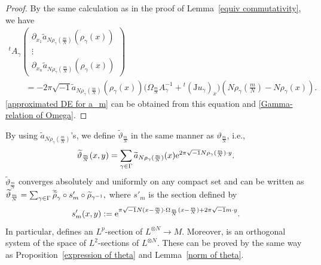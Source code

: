 \documentclass[pdftex]{sigma}
\numberwithin{equation}{section}
\newcommand{\Z}{\mathbb{Z}}
\renewcommand{\tilde}{\widetilde}
\newcommand{\vardbtilde}[1]{\tilde{\raisebox{0pt}[0.85\height]{$\tilde{#1}$}}}
\def\J{\mathrm{J}}
\begin{document}
\begin{proof}
By the same calculation as in the proof of Lemma~\ref{equiv commutativity}, we have
\begin{gather*}
{}^tA_{\gamma}
\begin{pmatrix}
\partial_{x_1}{\tilde a}_{N\rho_\gamma (\frac{m}{N})}( \rho_\gamma(x))\\
\vdots \\
\partial_{x_n}{\tilde a}_{N\rho_\gamma (\frac{m}{N})}( \rho_\gamma(x))
\end{pmatrix}\\
\qquad=-2\pi\sqrt{-1}{\tilde a}_{N\rho_\gamma (\frac{m}{N})}( \rho_\gamma(x))\bigl(\Omega_{\frac{m}{N}}A^{-1}_{\gamma}+{}^t( \J u_{\gamma})_x\bigr)
\left({N\rho_\gamma \left(\frac{m}{N}\right)}-N\rho_\gamma (x)\right).
\end{gather*}
\eqref{approximated DE for a_m} can be obtained from this equation and \eqref{Gamma-relation of Omega}.
\end{proof}

By using ${\tilde a}_{N\rho_\gamma (\frac{m}{N})}$'s, we define ${\tilde \vartheta}_{\frac{m}{N}}$ in the same manner as $\vartheta_{\frac{m}{N}}$, i.e.,
\[
{\tilde \vartheta}_{\frac{m}{N}}(x,y)=\sum_{\gamma \in \Gamma}{\tilde a}_{N\rho_\gamma (\frac{m}{N})}(x){\rm e}^{2\pi\sqrt{-1}N\rho_\gamma (\frac{m}{N})\cdot y}.
\]
${\tilde \vartheta}_{\frac{m}{N}}$ converges absolutely and uniformly on any compact set and can be written as
$
{\tilde \vartheta}_{\frac{m}{N}}=\sum_{\gamma \in \Gamma}{\vardbtilde \rho}_\gamma \circ s'_m\circ {\tilde \rho}_{\gamma^{-1}},
$
where $s'_m$ is the section defined by
\[
s'_m(x, y):={\rm e}^{\pi\sqrt{-1}N(x-\frac{m}{N})\cdot \Omega_{\frac{m}{N}}(x-\frac{m}{N})+2\pi\sqrt{-1}m\cdot y}.
\]
In particular, \smash{${\tilde \vartheta}_{\frac{m}{N}}$} defines an $L^p$-section of $L^{\otimes N}\to M$. Moreover, \smash{$\big\{{\tilde \vartheta}_{\frac{m}{N}}\big\}_{\frac{m}{N}\in F\cap \frac{1}{N}\Z^n}$} is an orthogonal system of the space of $L^2$-sections of $L^{\otimes N}$.
These can be proved by the same way as Proposition~\ref{expression of theta} and Lemma~\ref{norm of theta}.
\end{document}
